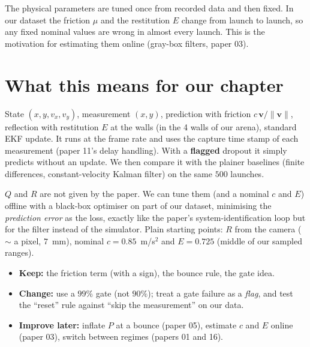 \documentclass[11pt,a4paper]{article}
\newcommand{\vv}{\bm{v}}
\begin{document}
\begin{warn}
The physical parameters are tuned once from recorded data and then fixed. In our dataset the
friction $\mu$ and the restitution $E$ change from launch to launch, so any fixed nominal values
are wrong in almost every launch. This is the motivation for estimating them online
(gray-box filters, paper 03).
\end{warn}

\section{What this means for our chapter}

\begin{ours}
State $(x,y,v_x,v_y)$, measurement $(x,y)$, prediction with friction $c\,\vv/\|\vv\|$, reflection with
restitution $E$ at the walls (in the 4 walls of our arena), standard EKF update. It runs at the
frame rate and uses the capture time stamp of each measurement (paper 11's delay handling). With a
\textbf{flagged} dropout it simply predicts without an update. We then compare it with the plainer
baselines (finite differences, constant-velocity Kalman filter) on the same $500$ launches.
\end{ours}

\begin{ours}
$Q$ and $R$ are not given by the paper. We can tune them (and a nominal $c$ and $E$) offline with a
black-box optimiser on part of our dataset, minimising the \emph{prediction error} as the loss,
exactly like the paper's system-identification loop but for the filter instead of the simulator.
Plain starting points: $R$ from the camera ($\sim$ a pixel, $7$~mm), nominal $c=0.85$~m/s$^2$ and
$E=0.725$ (middle of our sampled ranges).
\end{ours}

\begin{ours}
\begin{itemize}
\item \textbf{Keep:} the friction term (with a sign), the bounce rule, the gate idea.
\item \textbf{Change:} use a $99\%$ gate (not $90\%$); treat a gate failure as a \emph{flag}, and test
the ``reset'' rule against ``skip the measurement'' on our data.
\item \textbf{Improve later:} inflate $P$ at a bounce (paper 05), estimate $c$ and $E$ online
(paper 03), switch between regimes (papers 01 and 16).
\end{itemize}
\end{ours}
\end{document}
